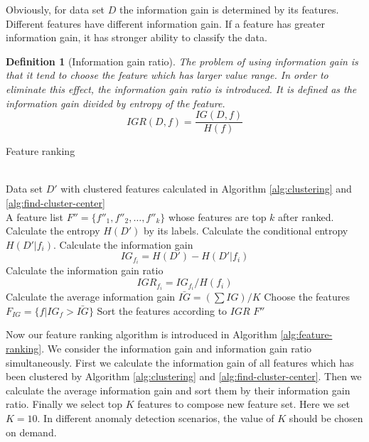 \documentclass[journal]{IEEEtran}
\newtheorem{definition}{Definition}
\begin{document}
Obviously, for data set $D$ the information gain is determined by its features. Different features have different information gain. If a feature has greater information gain, it has stronger ability to classify the data.

\begin{definition}[Information gain ratio]
The problem of using information gain is that it tend to choose the feature which has larger value range. In order to eliminate this effect, the information gain ratio is introduced. It is defined as the information gain divided by entropy of the feature. 
\begin{equation}
    IGR(D, f) = \frac{IG(D, f)}{H(f)}
\end{equation}
\end{definition}

\begin{algorithm}
    \caption{Feature ranking}
    \label{alg:feature-ranking}
    \begin{algorithmic}[1]
    \REQUIRE ~~\\
        Data set $D'$ with clustered features calculated in Algorithm \ref{alg:clustering} and \ref{alg:find-cluster-center}
    \ENSURE ~~\\
        A feature list $F''=\{f''_1, f''_2, \ldots, f''_k\}$ whose features are top $k$ after ranked. 
    \STATE Calculate the entropy $H(D')$ by its labels.
        \STATE Calculate the conditional entropy $H(D'|f_i)$.
        \STATE Calculate the information gain $$IG_{f_i} = H(D') - H(D'|f_i)$$
        \STATE Calculate the information gain ratio 
        $$IGR_{f_i} = IG_{f_i}/H(f_i)$$
    \ENDFOR
    \STATE Calculate the average information gain $\bar{IG}=(\sum IG) / K$
    \STATE Choose the features $F_{IG}=\{f|IG_{f} > \bar{IG}\}$
    \STATE Sort the features according to $IGR$
    \RETURN $F''$
    \end{algorithmic}
    \end{algorithm}

Now our feature ranking algorithm is introduced in Algorithm \ref{alg:feature-ranking}. We consider the information gain and information gain ratio simultaneously. First we calculate the information gain of all features which has been clustered by Algorithm \ref{alg:clustering} and \ref{alg:find-cluster-center}. Then we calculate the average information gain and sort them by their information gain ratio. Finally we select top $K$ features to compose new feature set. Here we set $K=10$. In different anomaly detection scenarios, the value of $K$ should be chosen on demand.
\end{document}
